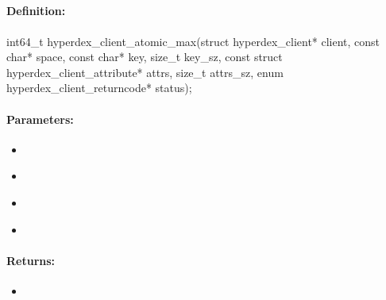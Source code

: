 \pagebreak
\subsection{}
\label{api:c:atomic_max}


\paragraph{Definition:}
\begin{ccode}
int64_t hyperdex_client_atomic_max(struct hyperdex_client* client,
        const char* space,
        const char* key, size_t key_sz,
        const struct hyperdex_client_attribute* attrs, size_t attrs_sz,
        enum hyperdex_client_returncode* status);
\end{ccode}

\paragraph{Parameters:}
\begin{itemize}[noitemsep]
\item {}\\

\item {}\\

\item {}\\

\item {}\\

\end{itemize}

\paragraph{Returns:}
\begin{itemize}[noitemsep]
\item {}\\

\end{itemize}

